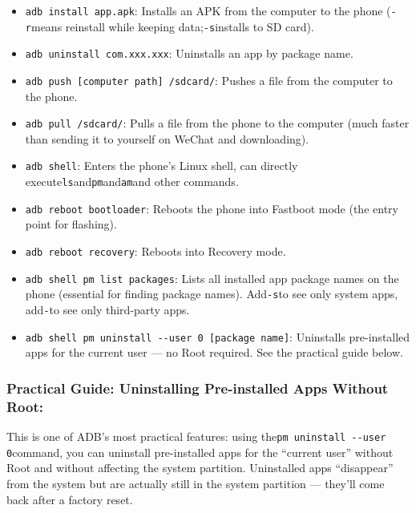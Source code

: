 \begin{itemize}
  \item \texttt{adb install app.\allowbreak apk}: Installs an APK from the computer to the phone (\texttt{-\allowbreak r}means reinstall while keeping data;\texttt{-\allowbreak s}installs to SD card).
  \item \texttt{adb uninstall com.\allowbreak xxx.\allowbreak xxx}: Uninstalls an app by package name.
  \item \texttt{adb push [computer path] /\allowbreak sdcard/}: Pushes a file from the computer to the phone.
  \item \texttt{adb pull /\allowbreak sdcard/}: Pulls a file from the phone to the computer (much faster than sending it to yourself on WeChat and downloading).
  \item \texttt{adb shell}: Enters the phone's Linux shell, can directly execute\texttt{ls}and\texttt{pm}and\texttt{am}and other commands.
  \item \texttt{adb reboot bootloader}: Reboots the phone into Fastboot mode (the entry point for flashing).
  \item \texttt{adb reboot recovery}: Reboots into Recovery mode.
  \item \texttt{adb shell pm list packages}: Lists all installed app package names on the phone (essential for finding package names). Add\texttt{-\allowbreak s}to see only system apps, add\texttt{-}to see only third-party apps.
  \item \texttt{adb shell pm uninstall -\allowbreak -\allowbreak user 0 [package name]}: Uninstalls pre-installed apps for the current user — no Root required. See the practical guide below.
\end{itemize}

\subsubsection*{Practical Guide: Uninstalling Pre-installed Apps Without Root:}

This is one of ADB's most practical features: using the\texttt{pm uninstall -\allowbreak -\allowbreak user 0}command, you can uninstall pre-installed apps for the “current user” without Root and without affecting the system partition. Uninstalled apps “disappear” from the system but are actually still in the system partition — they'll come back after a factory reset.

